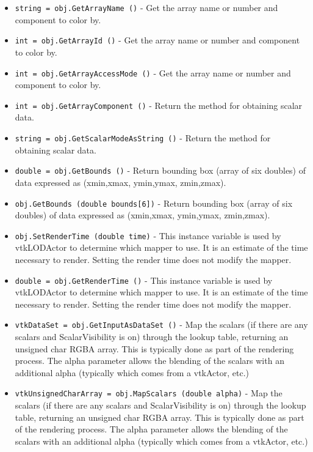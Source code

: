 \begin{itemize}
\item  \verb|string = obj.GetArrayName ()| -  Get the array name or number and component to color by.

\item  \verb|int = obj.GetArrayId ()| -  Get the array name or number and component to color by.

\item  \verb|int = obj.GetArrayAccessMode ()| -  Get the array name or number and component to color by.

\item  \verb|int = obj.GetArrayComponent ()| -  Return the method for obtaining scalar data.

\item  \verb|string = obj.GetScalarModeAsString ()| -  Return the method for obtaining scalar data.

\item  \verb|double = obj.GetBounds ()| -  Return bounding box (array of six doubles) of data expressed as
 (xmin,xmax, ymin,ymax, zmin,zmax).

\item  \verb|obj.GetBounds (double bounds[6])| -  Return bounding box (array of six doubles) of data expressed as
 (xmin,xmax, ymin,ymax, zmin,zmax).

\item  \verb|obj.SetRenderTime (double time)| -  This instance variable is used by vtkLODActor to determine which
 mapper to use.  It is an estimate of the time necessary to render.
 Setting the render time does not modify the mapper.

\item  \verb|double = obj.GetRenderTime ()| -  This instance variable is used by vtkLODActor to determine which
 mapper to use.  It is an estimate of the time necessary to render.
 Setting the render time does not modify the mapper.

\item  \verb|vtkDataSet = obj.GetInputAsDataSet ()| -  Map the scalars (if there are any scalars and ScalarVisibility is on)
 through the lookup table, returning an unsigned char RGBA array. This is
 typically done as part of the rendering process. The alpha parameter 
 allows the blending of the scalars with an additional alpha (typically
 which comes from a vtkActor, etc.)

\item  \verb|vtkUnsignedCharArray = obj.MapScalars (double alpha)| -  Map the scalars (if there are any scalars and ScalarVisibility is on)
 through the lookup table, returning an unsigned char RGBA array. This is
 typically done as part of the rendering process. The alpha parameter 
 allows the blending of the scalars with an additional alpha (typically
 which comes from a vtkActor, etc.)


\end{itemize}
